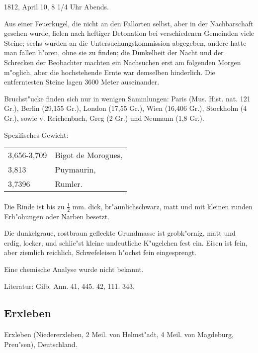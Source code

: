\documentclass[a4paper, 11pt, oneside]{article}
\begin{document}
1812, April 10, 8 1/4 Uhr Abends.

Aus einer Feuerkugel, die nicht an den Fallorten selbst, aber in der Nachbarschaft gesehen wurde, fielen nach heftiger Detonation bei verschiedenen Gemeinden viele Steine; sechs wurden an die Untersuchungskommission abgegeben, andere hatte man fallen h"oren, ohne sie zu finden; die Dunkelheit der Nacht und der Schrecken der Beobachter machten ein Nachsuchen erst am folgenden Morgen m"oglich, aber die hochstehende Ernte war demselben hinderlich. Die entferntesten Steine lagen 3600 Meter auseinander.

Bruchst"ucke finden sich nur in wenigen Sammlungen: Paris (Mus. Hist. nat. 121 Gr.), Berlin (29,155 Gr.), London (17,55 Gr.), Wien (16,406 Gr.), Stockholm (4 Gr.), sowie v. Reichenbach, Greg (2 Gr.) und Neumann (1,8 Gr.).

Spezifisches Gewicht:
\begin{table}[!ht]
    \centering
    \begin{tabular}{l l}
        3,656-3,709 & Bigot de Morogues,\\
        3,813 & Puymaurin,\\
        3,7396 & Rumler.
    \end{tabular}
\end{table}
\paragraph{}
Die Rinde ist bis zu $\frac{1}{2}$ mm. dick, br"aunlichschwarz, matt und mit kleinen runden Erh"ohungen oder Narben besetzt.

Die dunkelgraue, rostbraun gefleckte Grundmasse ist grobk"ornig, matt und erdig, locker, und schlie"st kleine undeutliche K"ugelchen fest ein. Eisen ist fein, aber ziemlich reichlich, Schwefeleisen h"ochst fein eingesprengt.

Eine chemische Analyse wurde nicht bekannt.

Literatur: Gilb. Ann. 41, 445. 42, 111. 343.

\subsection{Erxleben}
\normalsize
\paragraph{}
Erxleben (Niedererxleben, 2 Meil. von Helmst"adt, 4 Meil. von Magdeburg, Preu"sen), Deutschland.
\end{document}
